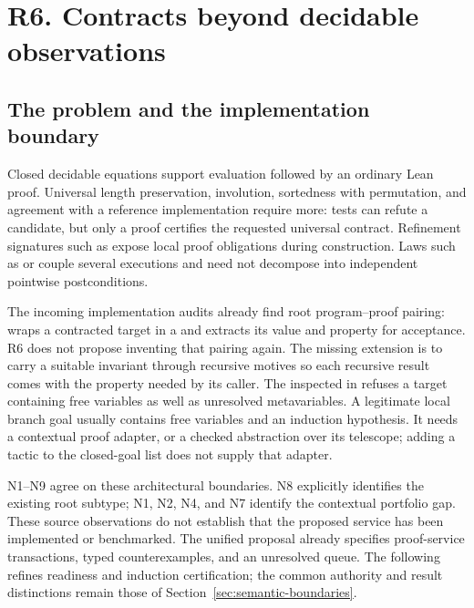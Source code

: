 \section{R6. Contracts beyond decidable observations}\label{sec:contracts}

\subsection{The problem and the implementation boundary}\label{sec:contract-boundary}

Closed decidable equations support evaluation followed by an ordinary Lean proof. Universal length preservation, involution, sortedness with permutation, and agreement with a reference implementation require more: tests can refute a candidate, but only a proof certifies the requested universal contract. Refinement signatures such as  expose local proof obligations during construction. Laws such as  or  couple several executions and need not decompose into independent pointwise postconditions.

The incoming implementation audits already find root program--proof pairing:  wraps a contracted target in a  and extracts its value and property for acceptance. R6 does not propose inventing that pairing again. The missing extension is to carry a suitable invariant through recursive motives so each recursive result comes with the property needed by its caller. The inspected  in  refuses a target containing free variables as well as unresolved metavariables. A legitimate local branch goal usually contains free variables and an induction hypothesis. It needs a contextual proof adapter, or a checked abstraction over its telescope; adding a tactic to the closed-goal list does not supply that adapter.

N1--N9 agree on these architectural boundaries. N8 explicitly identifies the existing root subtype; N1, N2, N4, and N7 identify the contextual portfolio gap. These source observations do not establish that the proposed service has been implemented or benchmarked. The unified proposal already specifies proof-service transactions, typed counterexamples, and an unresolved queue. The following refines readiness and induction certification; the common authority and result distinctions remain those of Section~\ref{sec:semantic-boundaries}.

